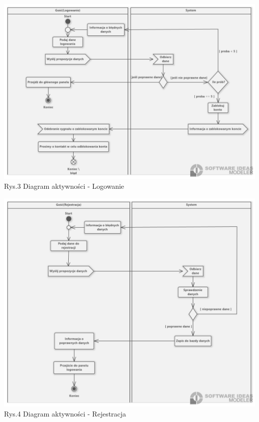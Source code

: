 \documentclass[12pt, letterpaper]{article}
\begin{document}
		
		\begin{center}
			\includegraphics[scale=0.5]{aclogowanie}\\
			\caption{Rys.3 Diagram aktywności - Logowanie}
		\end{center}	
		
		
		\begin{center}
			\includegraphics[scale=0.5]{acrejestracja}\\
			\caption{Rys.4 Diagram aktywności - Rejestracja}
		\end{center}
		
\end{document}
